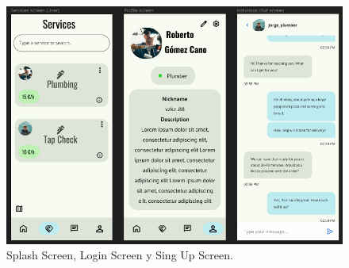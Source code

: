 \begin{figure}[h]
	\centering
	\includegraphics[width = 1\textwidth]{Imagenes/figma/figma3.png}
	\caption{Splash Screen, Login Screen y Sing Up Screen.}
	\label{fig:figma3}
\end{figure}